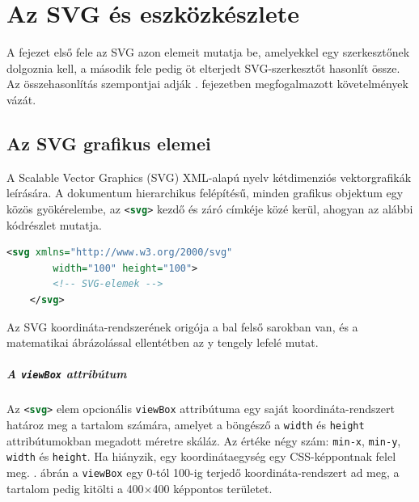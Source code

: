 \chapter{Az SVG és eszközkészlete}
\label{ch:svg}

A fejezet első fele az SVG azon elemeit mutatja be, amelyekkel egy szerkesztőnek dolgoznia kell, a második fele pedig öt elterjedt SVG-szerkesztőt hasonlít össze. Az összehasonlítás szempontjai adják . fejezetben megfogalmazott követelmények vázát.

\section{Az SVG grafikus elemei}
\label{sec:svg_graphical_elements}

A Scalable Vector Graphics (SVG) XML-alapú nyelv kétdimenziós vektorgrafikák leírására. A dokumentum hierarchikus felépítésű, minden grafikus objektum egy közös gyökérelembe, az \lstinline[language=XML]|<svg>| kezdő és záró címkéje közé kerül, ahogyan az alábbi kódrészlet mutatja.

\begin{lstlisting}[language=XML]
    <svg xmlns="http://www.w3.org/2000/svg"
        width="100" height="100">
        <!-- SVG-elemek -->
    </svg>
\end{lstlisting}

Az SVG koordináta-rendszerének origója a bal felső sarokban van, és a matematikai ábrázolással ellentétben az y tengely lefelé mutat.

\paragraph{A \texttt{viewBox} attribútum}
Az \lstinline[language=XML]|<svg>| elem opcionális \lstinline[language=XML]|viewBox| attribútuma egy saját koordináta-rendszert határoz meg a tartalom számára, amelyet a böngésző a \texttt{width} és \texttt{height} attribútumokban megadott méretre skáláz. Az értéke négy szám: \texttt{min-x}, \texttt{min-y}, \texttt{width} és \texttt{height}. Ha hiányzik, egy koordinátaegység egy CSS-képpontnak felel meg. . ábrán a \texttt{viewBox} egy 0-tól 100-ig terjedő koordináta-rendszert ad meg, a tartalom pedig kitölti a 400$\times$400 képpontos területet.

